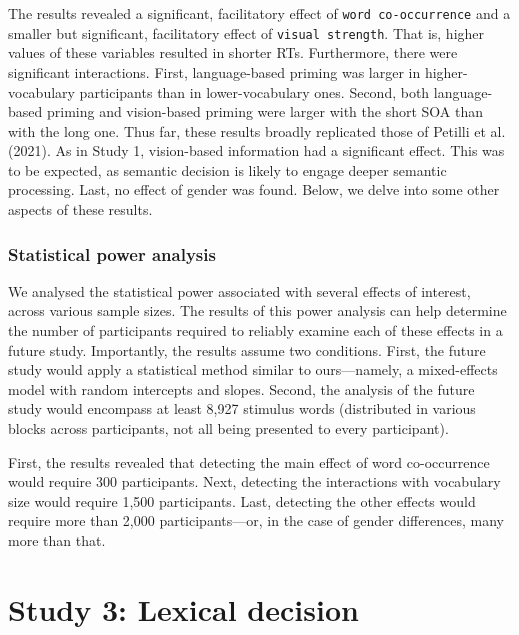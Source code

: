 \documentclass[
  12pt,
  man,floatsintext]{apa7}
\begin{document}
The results revealed a significant, facilitatory effect of \texttt{word\ co-occurrence} and a smaller but significant, facilitatory effect of \texttt{visual\ strength}. That is, higher values of these variables resulted in shorter RTs. Furthermore, there were significant interactions. First, language-based priming was larger in higher-vocabulary participants than in lower-vocabulary ones. Second, both language-based priming and vision-based priming were larger with the short SOA than with the long one. Thus far, these results broadly replicated those of Petilli et al. (2021). As in Study 1, vision-based information had a significant effect. This was to be expected, as semantic decision is likely to engage deeper semantic processing. Last, no effect of gender was found. Below, we delve into some other aspects of these results.

\hypertarget{statistical-power-analysis-5}{%
\subsubsection{Statistical power analysis}\label{statistical-power-analysis-5}}

We analysed the statistical power associated with several effects of interest, across various sample sizes. The results of this power analysis can help determine the number of participants required to reliably examine each of these effects in a future study. Importantly, the results assume two conditions. First, the future study would apply a statistical method similar to ours---namely, a mixed-effects model with random intercepts and slopes. Second, the analysis of the future study would encompass at least 8,927 stimulus words (distributed in various blocks across participants, not all being presented to every participant).

First, the results revealed that detecting the main effect of word co-occurrence would require 300 participants. Next, detecting the interactions with vocabulary size would require 1,500 participants. Last, detecting the other effects would require more than 2,000 participants---or, in the case of gender differences, many more than that.

\clearpage

\hypertarget{lexicaldecision}{%
\section{Study 3: Lexical decision}\label{lexicaldecision}}
\end{document}
